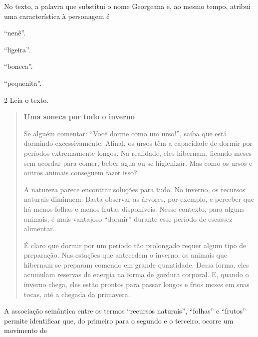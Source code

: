 
No texto, a palavra que substitui o nome Georgeana e, ao mesmo tempo,
atribui uma característica à personagem é

\begin{escolha}
\item ``nenê''.

\item ``ligeira''.

\item ``boneca''.

\item ``pequenita''.
\end{escolha}

\num{2} Leia o texto.

\begin{quote}
\centering\textbf{Uma soneca por todo o inverno}


Se alguém comentar: ``Você dorme como um urso!'', saiba que está
dormindo excessivamente. Afinal, os ursos têm a capacidade de dormir por
períodos extremamente longos. Na realidade, eles hibernam, ficando meses
sem acordar para comer, beber água ou se higienizar. Mas como os ursos e
outros animais conseguem fazer isso?

A natureza parece encontrar soluções para tudo. No inverno, os recursos
naturais diminuem. Basta observar as árvores, por exemplo, e perceber
que há menos folhas e menos frutas disponíveis. Nesse contexto, para
alguns animais, é mais vantajoso ``dormir'' durante esse período de
escassez alimentar.

É claro que dormir por um período tão prolongado requer algum tipo de
preparação. Nas estações que antecedem o inverno, os animais que
hibernam se preparam comendo em grande quantidade. Dessa forma, eles
acumulam reservas de energia na forma de gordura corporal. E, quando o
inverno chega, eles estão prontos para passar longos e frios meses em
suas tocas, até a chegada da primavera.
\end{quote}


A associação semântica entre os termos ``recursos naturais'', ``folhas''
e ``frutos'' permite identificar que, do primeiro para o segundo e o
terceiro, ocorre um movimento de

